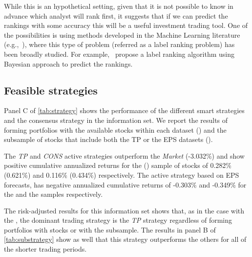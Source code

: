\documentclass[a4paper,twoside,12pt,openright,notitlepage]{report}\usepackage[]{graphicx}\usepackage[]{color}
\begin{document}
While this is an hypothetical setting, given that it is not possible to know in advance which analyst will rank first, it suggests that if we can predict the rankings with some accuracy this will be a useful investment trading tool. One of the possibilities is using methods developed in the Machine Learning literature (e.g.,~\cite{aiguzhinov2010,brazdil2003}), where this type of problem (referred as a label ranking problem) has been broadly studied. For example,~\cite{aiguzhinov2010} propose a label ranking algorithm using Bayesian approach to predict the rankings.



\subsection{Feasible strategies}
Panel C of \ref{tab:strategy} shows the performance of the different smart strategies and the consensus strategy in the \naive{} information set. We report the results of forming portfolios with the available stocks within each dataset (\all{}) and the subsample of stocks that include both the TP or the EPS datasets (\same{}).

The \textit{TP} and \textit{CONS} active strategies outperform the \textit{Market} (-3.032\%)  and show positive cumulative annualized returns for the \all{} (\same{}) sample of stocks of 0.282\% (0.621\%) and  0.116\% (0.434\%) respectively. The active strategy based on EPS forecasts, has negative annualized cumulative returns of  -0.303\% and -0.349\% for the \all{} and the \same{} samples respectively.

The risk-adjusted results for this information set shows that, as in the case with the \tr{}, the dominant trading strategy is the \textit{TP} strategy regardless of forming portfolios with \all{} stocks or with the \same{} subsample.
The results in panel B of \ref{tab:substrategy} show as well that this strategy outperforms the others for all of the shorter trading periods.
\end{document}
